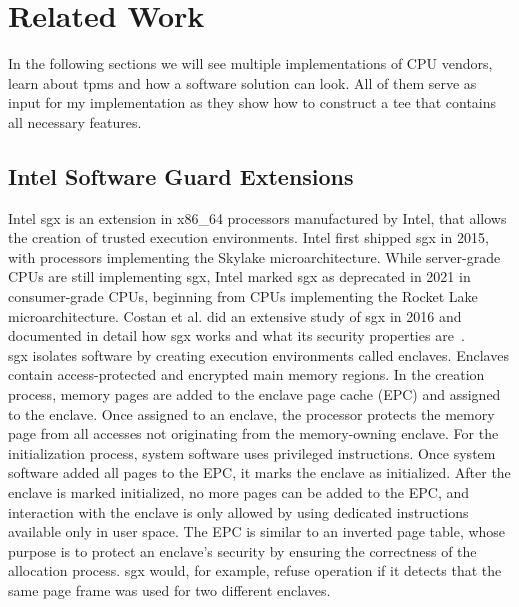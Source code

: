 \chapter{Related Work}
\label{chap:related}

In the following sections we will see multiple implementations of CPU vendors,
learn about \glspl{tpm} and how a software solution can look. All of them serve
as input for my implementation as they show how to construct a \gls{tee} that
contains all necessary features.

\section{Intel Software Guard Extensions}
\label{sec:20:sgx}
Intel \gls{sgx} is an extension in x86\_64 processors manufactured by Intel,
that allows the creation of trusted execution environments. Intel first shipped
\gls{sgx} in 2015, with processors implementing the Skylake microarchitecture.
While server-grade CPUs are still implementing \gls{sgx}, Intel marked \gls{sgx}
as deprecated in 2021 in consumer-grade CPUs, beginning from CPUs implementing
the Rocket Lake microarchitecture. Costan et al. did an extensive study of
\gls{sgx} in 2016 and documented in detail how \gls{sgx} works and what its
security properties are~\cite{costan2016intel}. \\

\gls{sgx} isolates software by creating execution environments called enclaves.
Enclaves contain access-protected and encrypted main memory regions. In the
creation process, memory pages are added to the enclave page cache (EPC) and
assigned to the enclave. Once assigned to an enclave, the processor protects the
memory page from all accesses not originating from the memory-owning enclave.
For the initialization process, system software uses privileged instructions.
Once system software added all pages to the EPC, it marks the enclave as
initialized. After the enclave is marked initialized, no more pages can be
added to the EPC, and interaction with the enclave is only allowed by using
dedicated instructions available only in user space. The EPC is similar to an
inverted page table, whose purpose is to protect an enclave's security by
ensuring the correctness of the allocation process. \gls{sgx} would, for
example, refuse operation if it detects that the same page frame was used for
two different enclaves.\\

